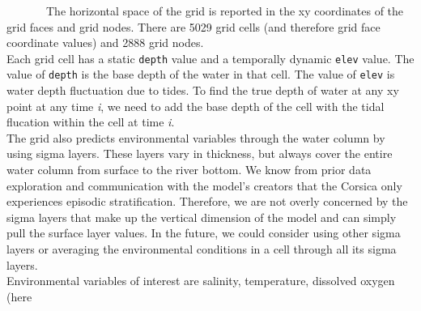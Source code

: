 \documentclass[
]{article}
\begin{document}
~~~~~~~The horizontal space of the grid is reported in the xy
coordinates of the grid faces and grid nodes. There are 5029 grid cells
(and therefore grid face coordinate values) and 2888 grid nodes.\\
\hspace*{0.333em}\hspace*{0.333em}\hspace*{0.333em}\hspace*{0.333em}\hspace*{0.333em}\hspace*{0.333em}\hspace*{0.333em}Each
grid cell has a static \texttt{depth} value and a temporally dynamic
\texttt{elev} value. The value of \texttt{depth} is the base depth of
the water in that cell. The value of \texttt{elev} is water depth
fluctuation due to tides. To find the true depth of water at any xy
point at any time \emph{i}, we need to add the base depth of the cell
with the tidal flucation within the cell at time \emph{i}.\\
\hspace*{0.333em}\hspace*{0.333em}\hspace*{0.333em}\hspace*{0.333em}\hspace*{0.333em}\hspace*{0.333em}\hspace*{0.333em}The
grid also predicts environmental variables through the water column by
using sigma layers. These layers vary in thickness, but always cover the
entire water column from surface to the river bottom. We know from prior
data exploration and communication with the model's creators that the
Corsica only experiences episodic stratification. Therefore, we are not
overly concerned by the sigma layers that make up the vertical dimension
of the model and can simply pull the surface layer values. In the
future, we could consider using other sigma layers or averaging the
environmental conditions in a cell through all its sigma layers.\\
\hspace*{0.333em}\hspace*{0.333em}\hspace*{0.333em}\hspace*{0.333em}\hspace*{0.333em}\hspace*{0.333em}\hspace*{0.333em}Environmental
variables of interest are salinity, temperature, dissolved oxygen (here
\end{document}
